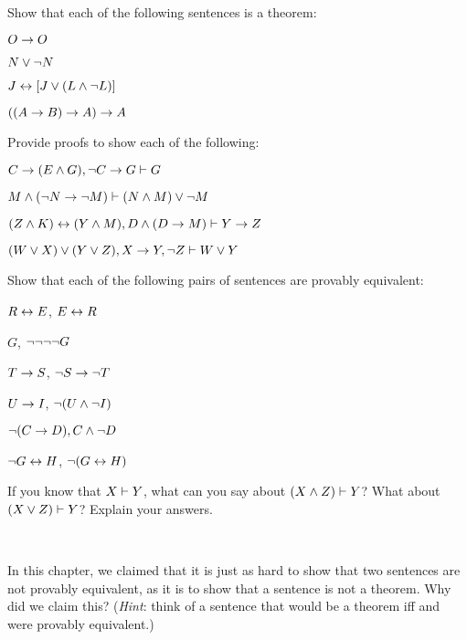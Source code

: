 \begin{practiceproblems}
\problempart
Show that each of the following sentences is a theorem:
\begin{earg}
\item $O \rightarrow O$
\item $N \vee \neg N$
\item $J \leftrightarrow [J\vee (L\mathbin{\wedge}\neg L)]$
\item $((A \rightarrow B) \rightarrow A) \rightarrow A$
\end{earg}

\problempart
Provide proofs to show each of the following:
\begin{earg}
\item $C\rightarrow(E\mathbin{\wedge} G), \neg C \rightarrow G \vdash G$
\item $M \mathbin{\wedge} (\neg N \rightarrow \neg M) \vdash (N \mathbin{\wedge} M) \vee \neg M$
\item $(Z\mathbin{\wedge} K)\leftrightarrow(Y\mathbin{\wedge} M), D\mathbin{\wedge}(D\rightarrow M) \vdash Y\rightarrow Z$
\item $(W \vee X) \vee (Y \vee Z), X\rightarrow Y, \neg Z \vdash W\vee Y$
\end{earg}

\problempart
Show that each of the following pairs of sentences are provably equivalent:
\begin{earg}
\item $R \leftrightarrow E$, $E \leftrightarrow R$
\item $G$, $\neg\neg\neg\neg G$
\item $T\rightarrow S$, $\neg S \rightarrow \neg T$
\item $U \rightarrow I$, $\neg(U \mathbin{\wedge} \neg I)$
\item $\neg (C \rightarrow D), C \mathbin{\wedge} \neg D$
\item $\neg G \leftrightarrow H$, $\neg(G \leftrightarrow H)$
\end{earg}

\problempart
If you know that $X\vdash Y$, what can you say about $(X\mathbin{\wedge}Z)\vdash Y$? What about $(X\vee Z)\vdash Y$? Explain your answers.

\

\problempart In this chapter, we claimed that it is just as hard to show that two sentences are not provably equivalent, as it is to show that a sentence is not a theorem. Why did we claim this? (\emph{Hint}: think of a sentence that would be a theorem iff \metaX and \metaY were provably equivalent.)


\end{practiceproblems}
